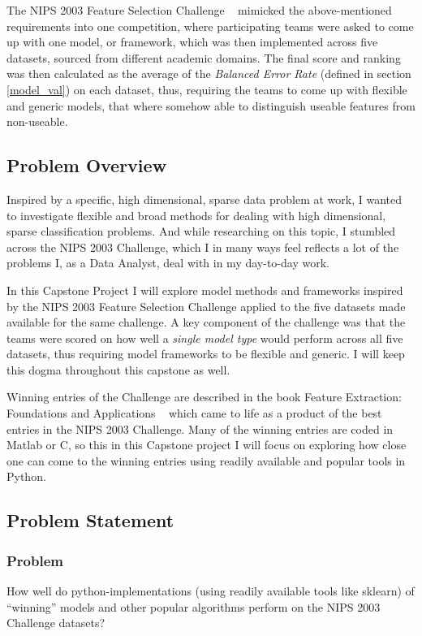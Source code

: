 \documentclass[12pt]{article}
\begin{document}
The NIPS 2003 Feature Selection Challenge ~\cite{nips03workshop} mimicked the above-mentioned requirements into one competition, where participating teams were asked to come up with one model, or framework, which was then implemented across five datasets, sourced from different academic domains. The final score and ranking was then calculated as the average of the \emph{Balanced Error Rate} (defined in section \ref{model_val}) on each dataset, thus, requiring the teams to come up with flexible and generic models, that where somehow able to distinguish useable features from non-useable.

\subsection{Problem Overview}

Inspired by a specific, high dimensional, sparse data problem at work, I wanted to investigate flexible and broad methods for dealing with high dimensional, sparse classification problems. And while researching on this topic, I stumbled across the NIPS 2003 Challenge, which I in many ways feel reflects a lot of the problems I, as a Data Analyst, deal with in my day-to-day work.

In this Capstone Project I will explore model methods and frameworks inspired by the NIPS 2003 Feature Selection Challenge applied to the five datasets made available for the same challenge. A key component of the challenge was that the teams were scored on how well a \emph{single model type} would perform across all five datasets, thus requiring model frameworks to be flexible and generic. I will keep this dogma throughout this capstone as well.

Winning entries of the Challenge are described in the book Feature Extraction: Foundations and Applications ~\cite{nips03book} which came to life as a product of the best entries in the NIPS 2003 Challenge. Many of the winning entries are coded in Matlab or C, so this in this Capstone project I will focus on exploring how close one can come to the winning entries using readily available and popular tools in Python.


\subsection{Problem Statement}

\subsubsection{Problem}
How well do python-implementations (using readily available tools like sklearn) of “winning” models and other popular algorithms perform on the NIPS 2003 Challenge datasets?
\end{document}
